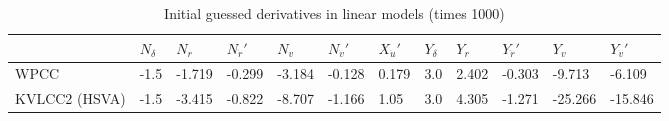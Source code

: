 \begin{table}[h]
    \footnotesize
    \caption{Initial guessed derivatives in linear models (times 1000)}
    \label{tab:initial}
    \begin{tabular}{|T|T|T|T|T|T|T|T|T|T|T|T|}
\hline
 & 

\( N_{\delta} \)
& 

\( N_{r} \)
& 

\( N_{\dot{r}}' \)
& 

\( N_{v} \)
& 

\( N_{\dot{v}}' \)
& 

\( X_{\dot{u}}' \)
& 

\( Y_{\delta} \)
& 

\( Y_{r} \)
& 

\( Y_{\dot{r}}' \)
& 

\( Y_{v} \)
& 

\( Y_{\dot{v}}' \)
\\
\hline

WPCC
&

-1.5
&

-1.719
&

-0.299
&

-3.184
&

-0.128
&

0.179
&

3.0
&

2.402
&

-0.303
&

-9.713
&

-6.109
\\
\hline

KVLCC2 (HSVA)
&

-1.5
&

-3.415
&

-0.822
&

-8.707
&

-1.166
&

1.05
&

3.0
&

4.305
&

-1.271
&

-25.266
&

-15.846
\\
\hline
\end{tabular}

\end{table}

